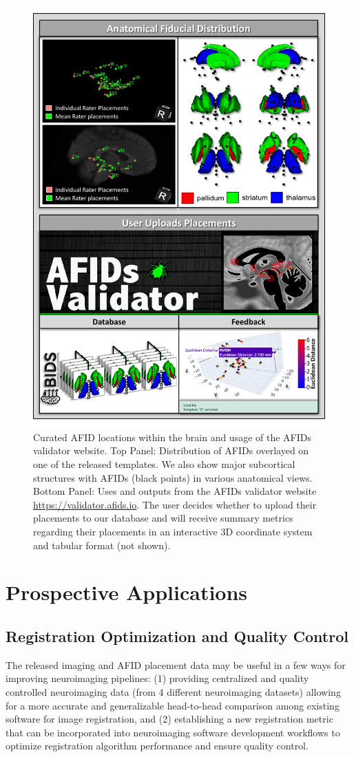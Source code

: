 \begin{figure}
    \centering
    \includegraphics[width=0.9\linewidth]{figs/ch2_Figure_2.pdf}
    \caption{Curated AFID locations within the brain and usage of the AFIDs validator website. Top Panel: Distribution of AFIDs overlayed on one of the released templates. We also show major subcortical structures with AFIDs (black points) in various anatomical views. Bottom Panel: Uses and outputs from the AFIDs validator website \url{https://validator.afids.io}. The user decides whether to upload their placements to our database and will receive summary metrics regarding their placements in an interactive 3D coordinate system and tabular format (not shown).}
    \label{fig:ch2_Figure_2}
\end{figure}

\section{Prospective Applications}
\subsection{Registration Optimization and Quality Control}
The released imaging and AFID placement data may be useful in a few ways for improving neuroimaging pipelines: (1) providing centralized and quality controlled neuroimaging data (from 4 different neuroimaging datasets) allowing for a more accurate and generalizable head-to-head comparison among existing software for image registration, and (2) establishing a new registration metric that can be incorporated into neuroimaging software development workflows to optimize registration algorithm performance and ensure quality control.

